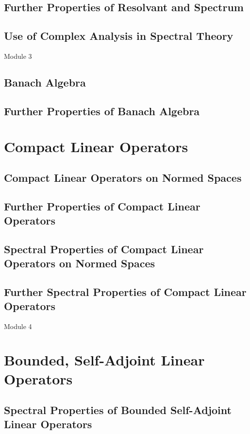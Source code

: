 \subsection{Further Properties of Resolvant and Spectrum}
\subsection{Use of Complex Analysis in Spectral Theory}
\pagebreak

{\Large Module 3}
\subsection{Banach Algebra}
\subsection{Further Properties of Banach Algebra}

\section{Compact Linear Operators}
\subsection{Compact Linear Operators on Normed Spaces}
\subsection{Further Properties of Compact Linear Operators}
\subsection{Spectral Properties of Compact Linear Operators on Normed Spaces}
\subsection{Further Spectral Properties of Compact Linear Operators}
\pagebreak

{\Large Module 4}
\section{Bounded, Self-Adjoint Linear Operators}
\subsection{Spectral Properties of Bounded Self-Adjoint Linear Operators}
